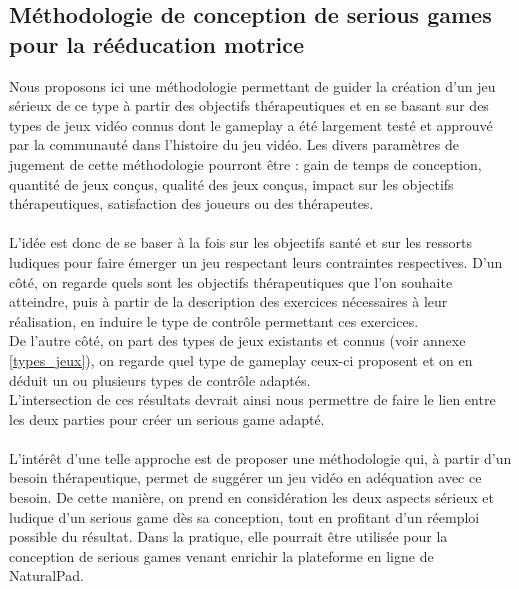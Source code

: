 \subsection{Méthodologie de conception de serious games pour la rééducation motrice}
Nous proposons ici une méthodologie permettant de guider la création d’un jeu sérieux de ce type à partir des objectifs thérapeutiques et en se basant sur des types de jeux vidéo connus dont le gameplay a été largement testé et approuvé par la communauté dans l’histoire du jeu vidéo. Les divers paramètres de jugement de cette méthodologie pourront être : gain de temps de conception, quantité de jeux conçus, qualité des jeux conçus, impact sur les objectifs thérapeutiques, satisfaction des joueurs ou des thérapeutes.

\paragraph{}L’idée est donc de se baser à la fois sur les objectifs santé et sur les ressorts ludiques pour faire émerger un jeu respectant leurs contraintes respectives.
D’un côté, on regarde quels sont les objectifs thérapeutiques que l’on souhaite atteindre, puis à partir de la description des exercices nécessaires à leur réalisation, en induire le type de contrôle permettant ces exercices.\\
De l’autre côté, on part des types de jeux existants et connus (voir annexe \ref{types_jeux}), on regarde quel type de gameplay ceux-ci proposent et on en déduit un ou plusieurs types de contrôle adaptés.\\
L’intersection de ces résultats devrait ainsi nous permettre de faire le lien entre les deux parties pour créer un serious game adapté. 

\paragraph{}L’intérêt d’une telle approche est de proposer une méthodologie qui, à partir d’un besoin thérapeutique, permet de suggérer un jeu vidéo en adéquation avec ce besoin. De cette manière, on prend en considération les deux aspects sérieux et ludique d’un serious game dès sa conception, tout en profitant d’un réemploi possible du résultat. Dans la pratique, elle pourrait être utilisée pour la conception de serious games venant enrichir la plateforme en ligne de NaturalPad. 

